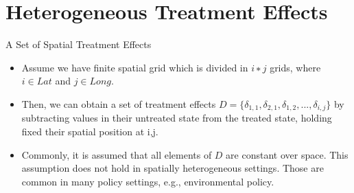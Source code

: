 \section{Heterogeneous Treatment Effects}

\begin{frame}{A Set of Spatial Treatment Effects}
\begin{itemize}
    \item Assume we have finite spatial grid which is divided in $i∗j$ grids, where $i \in Lat$ and $j \in Long$. 
    \vspace{-7pt}
    \item Then, we can obtain a set of treatment effects $D = \{\delta_{1,1}, \delta_{2,1}, \delta_{1,2}, ..., \delta_{i,j}\}$ by subtracting values in their untreated state from the treated state, holding fixed their spatial position at i,j. 
    \vspace{-7pt}
    \item Commonly, it is assumed that all elements of $D$ are constant over space. This assumption does not hold in spatially heterogeneous settings. Those are common in many policy settings, e.g., environmental policy.
\end{itemize}
\end{frame}

